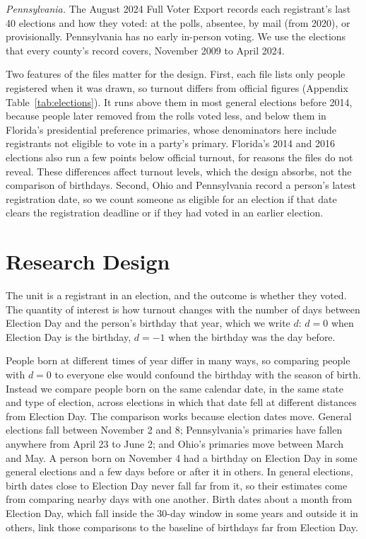 \documentclass[11pt]{article}
\begin{document}
\emph{Pennsylvania.} The August 2024 Full Voter Export records each registrant's last 40 elections and how they voted: at the polls, absentee, by mail (from 2020), or provisionally. Pennsylvania has no early in-person voting. We use the \nElectionsPa{} elections that every county's record covers, November 2009 to April 2024.

Two features of the files matter for the design. First, each file lists only people registered when it was drawn, so turnout differs from official figures (Appendix Table~\ref{tab:elections}). It runs above them in most general elections before 2014, because people later removed from the rolls voted less, and below them in Florida's presidential preference primaries, whose denominators here include registrants not eligible to vote in a party's primary. Florida's 2014 and 2016 elections also run a few points below official turnout, for reasons the files do not reveal. These differences affect turnout levels, which the design absorbs, not the comparison of birthdays. Second, Ohio and Pennsylvania record a person's latest registration date, so we count someone as eligible for an election if that date clears the registration deadline or if they had voted in an earlier election.

\section{Research Design}

The unit is a registrant in an election, and the outcome is whether they voted. The quantity of interest is how turnout changes with the number of days between Election Day and the person's birthday that year, which we write $d$: $d = 0$ when Election Day is the birthday, $d = -1$ when the birthday was the day before.

People born at different times of year differ in many ways, so comparing people with $d = 0$ to everyone else would confound the birthday with the season of birth. Instead we compare people born on the same calendar date, in the same state and type of election, across elections in which that date fell at different distances from Election Day. The comparison works because election dates move. General elections fall between November 2 and 8; Pennsylvania's primaries have fallen anywhere from April 23 to June 2; and Ohio's primaries move between March and May. A person born on November 4 had a birthday on Election Day in some general elections and a few days before or after it in others. In general elections, birth dates close to Election Day never fall far from it, so their estimates come from comparing nearby days with one another. Birth dates about a month from Election Day, which fall inside the 30-day window in some years and outside it in others, link those comparisons to the baseline of birthdays far from Election Day.
\end{document}
